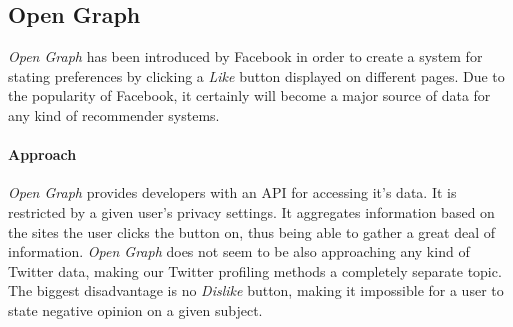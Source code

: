 \subsection{Open Graph}
\textit{Open Graph} has been introduced by Facebook in order to create a system for stating preferences by clicking a \textit{Like} button displayed on different pages. Due to the popularity of Facebook, it certainly will become a major source of data for any kind of recommender systems.

\paragraph{Approach}
\textit{Open Graph} provides developers with an API for accessing it's data. It is restricted by a given user's privacy settings.
It aggregates information based on the sites the user clicks the button on, thus being able to gather a great deal of information. \textit{Open Graph} does not seem to be also approaching any kind of Twitter data, making our Twitter profiling methods a completely separate topic.
The biggest disadvantage is no \textit{Dislike} button, making it impossible for a user to state negative opinion on a given subject.


